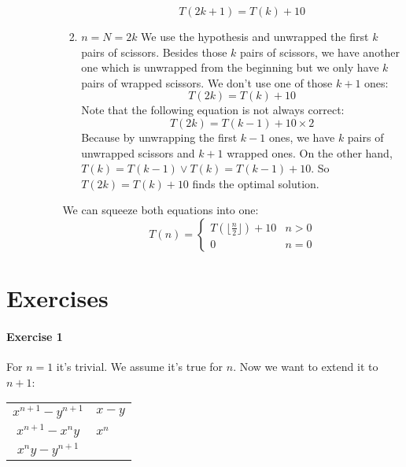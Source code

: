 \documentclass{book}
\begin{document}
\begin{itemize}
\begin{itemize}
\begin{itemize}
\begin{enumerate}
\begin{equation*}
						T(2k + 1) = T(k) + 10
					\end{equation*}
					\item $n = N = 2k$ We use the hypothesis and unwrapped the first $k$ pairs of scissors. Besides those $k$ pairs of scissors, we have another one which is unwrapped from the beginning but we only have $k$ pairs of wrapped scissors. We don't use one of those $k + 1$ ones:
					\begin{equation*}
						T(2k) = T(k) + 10
					\end{equation*}
					Note that the following equation is not always correct:
					\begin{equation*}
						T(2k) = T(k - 1) + 10 \times 2
					\end{equation*}
					Because by unwrapping the first $k - 1$ ones, we have $k$ pairs of unwrapped scissors and $k + 1$ wrapped ones. On the other hand, $T(k) = T(k - 1) \lor T(k) = T(k - 1) + 10$. So $T(2k) = T(k) + 10$ finds the optimal solution.
				\end{enumerate}
				We can squeeze both equations into one:
				\begin{equation*}
					T(n) = \begin{cases}
						T(\lfloor \frac{n}{2} \rfloor) + 10 & n > 0 \\
						0 & n = 0
					\end{cases}
				\end{equation*}    	
			\end{itemize}
		\end{itemize}
	\end{itemize}

	\section{Exercises}
	\paragraph{Exercise 1}
	For $n = 1$ it's trivial. We assume it's true for $n$. Now we want to extend it to $n + 1$:
	\begin{table*}[h]
		\centering
	\begin{tabular}{c | l}
		$x^{n + 1} - y^{n + 1}$ & $x - y$ \\
		\cline{2-2}
		$x^{n + 1} - x^ny$ & $x^n$ \\
		\cline{1-1}
		$x^ny-y^{n + 1}$ & $$
	\end{tabular}
	\end{table*}
	\FloatBarrier
	
\end{document}
